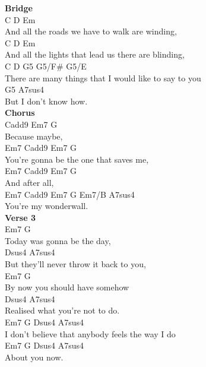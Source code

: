 \documentclass[a4paper]{article}
\begin{document}
{{        }
        \textbf{Bridge}
        ~\\
        {
            \cutive
            \obeyspaces
    C                D                Em
\\
And all the roads we have to walk are winding,
\\
    C                   D                 Em
\\
And all the lights that lead us there are blinding,
\\
C              D                   G5      G5/F\#  G5/E
\\
There are many things that I would like to say to you
\\
      G5         A7sus4
\\
But I don't know how.
\\

        }
        \textbf{Chorus}
        ~\\
        {
            \cutive
            \obeyspaces
        Cadd9  Em7   G
\\
Because maybe,
\\
       Em7                   Cadd9     Em7 G
\\
You're gonna be the one that saves me,
\\
    Em7   Cadd9  Em7   G
\\
And after all,
\\
          Em7   Cadd9  Em7   G Em7/B   A7sus4 
\\
You're my wonderwall.
\\

        }
        \textbf{Verse 3}
        ~\\
        {
            \cutive
            \obeyspaces
Em7       G
\\
Today was gonna be the day,
\\
            Dsus4                  A7sus4
\\
But they'll never throw it back to you,
\\
Em7        G
\\
By now you should have somehow
\\
   Dsus4                    A7sus4
\\
Realised what you're not to do.
\\
Em7                  G       Dsus4           A7sus4
\\
I don't believe that anybody feels the way I do
\\
          Em7  G     Dsus4 A7sus4  
\\
About you now.
\\

}}
\end{document}
